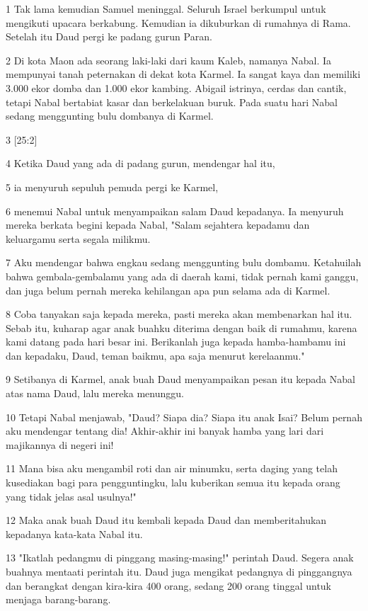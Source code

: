 \par 1 Tak lama kemudian Samuel meninggal. Seluruh Israel berkumpul untuk mengikuti upacara berkabung. Kemudian ia dikuburkan di rumahnya di Rama. Setelah itu Daud pergi ke padang gurun Paran.
\par 2 Di kota Maon ada seorang laki-laki dari kaum Kaleb, namanya Nabal. Ia mempunyai tanah peternakan di dekat kota Karmel. Ia sangat kaya dan memiliki 3.000 ekor domba dan 1.000 ekor kambing. Abigail istrinya, cerdas dan cantik, tetapi Nabal bertabiat kasar dan berkelakuan buruk. Pada suatu hari Nabal sedang menggunting bulu dombanya di Karmel.
\par 3 [25:2]
\par 4 Ketika Daud yang ada di padang gurun, mendengar hal itu,
\par 5 ia menyuruh sepuluh pemuda pergi ke Karmel,
\par 6 menemui Nabal untuk menyampaikan salam Daud kepadanya. Ia menyuruh mereka berkata begini kepada Nabal, "Salam sejahtera kepadamu dan keluargamu serta segala milikmu.
\par 7 Aku mendengar bahwa engkau sedang menggunting bulu dombamu. Ketahuilah bahwa gembala-gembalamu yang ada di daerah kami, tidak pernah kami ganggu, dan juga belum pernah mereka kehilangan apa pun selama ada di Karmel.
\par 8 Coba tanyakan saja kepada mereka, pasti mereka akan membenarkan hal itu. Sebab itu, kuharap agar anak buahku diterima dengan baik di rumahmu, karena kami datang pada hari besar ini. Berikanlah juga kepada hamba-hambamu ini dan kepadaku, Daud, teman baikmu, apa saja menurut kerelaanmu."
\par 9 Setibanya di Karmel, anak buah Daud menyampaikan pesan itu kepada Nabal atas nama Daud, lalu mereka menunggu.
\par 10 Tetapi Nabal menjawab, "Daud? Siapa dia? Siapa itu anak Isai? Belum pernah aku mendengar tentang dia! Akhir-akhir ini banyak hamba yang lari dari majikannya di negeri ini!
\par 11 Mana bisa aku mengambil roti dan air minumku, serta daging yang telah kusediakan bagi para pengguntingku, lalu kuberikan semua itu kepada orang yang tidak jelas asal usulnya!"
\par 12 Maka anak buah Daud itu kembali kepada Daud dan memberitahukan kepadanya kata-kata Nabal itu.
\par 13 "Ikatlah pedangmu di pinggang masing-masing!" perintah Daud. Segera anak buahnya mentaati perintah itu. Daud juga mengikat pedangnya di pinggangnya dan berangkat dengan kira-kira 400 orang, sedang 200 orang tinggal untuk menjaga barang-barang.
